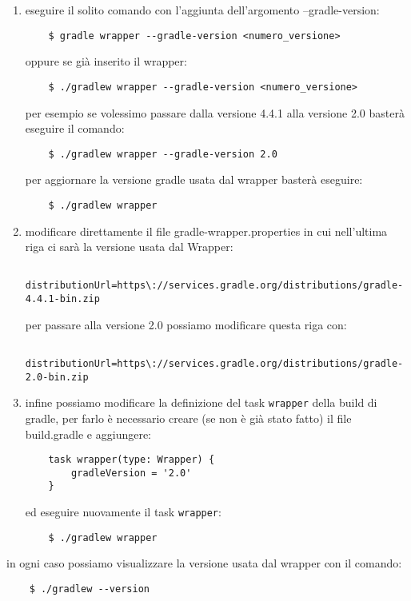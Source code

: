 \begin{enumerate}
    \item eseguire il solito comando con l'aggiunta dell'argomento --gradle-version:
\begin{verbatim}
    $ gradle wrapper --gradle-version <numero_versione> \end{verbatim}
oppure se già inserito il wrapper:
\begin{verbatim}
    $ ./gradlew wrapper --gradle-version <numero_versione> \end{verbatim}
per esempio se volessimo passare dalla versione 4.4.1 alla versione 2.0 basterà eseguire il comando:
\begin{verbatim}
    $ ./gradlew wrapper --gradle-version 2.0 \end{verbatim}
per aggiornare la versione gradle usata dal wrapper basterà eseguire:
\begin{verbatim}
    $ ./gradlew wrapper \end{verbatim}
    \item modificare direttamente il file gradle-wrapper.properties in cui nell'ultima riga ci sarà la versione usata dal Wrapper:
\begin{verbatim}
    distributionUrl=https\://services.gradle.org/distributions/gradle-4.4.1-bin.zip \end{verbatim}
    per passare alla versione 2.0 possiamo modificare questa riga con:
\begin{verbatim}
    distributionUrl=https\://services.gradle.org/distributions/gradle-2.0-bin.zip \end{verbatim}
    \item infine possiamo modificare la definizione del task \texttt{wrapper} della build di gradle, per farlo è necessario creare (se non è già stato fatto) il file build.gradle e aggiungere:
\begin{verbatim}
    task wrapper(type: Wrapper) {
        gradleVersion = '2.0'
    } \end{verbatim}
    ed eseguire nuovamente il task \texttt{wrapper}:
\begin{verbatim}
    $ ./gradlew wrapper \end{verbatim}
\end{enumerate}
in ogni caso possiamo visualizzare la versione usata dal wrapper con il comando:
\begin{verbatim}
    $ ./gradlew --version \end{verbatim}